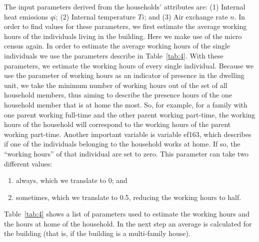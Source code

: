 \documentclass[11pt]{IJM-article}
\begin{document}
The input parameters derived from the households' attributes are: (1) Internal
heat emissions $qi$; (2) Internal temperature $Ti$; and (3) Air exchange rate
$n$. In order to find values for these parameters, we first estimate the
average working hours of the individuals living in the building.  Here we make
use of the micro census again. In order to estimate the average working hours
of the single individuals we use the parameters describe in Table~\ref{tab:4}.
With these parameters, we estimate the working hours of every single
individual. Because we use the parameter of working hours as an indicator of
presence in the dwelling unit, we take the minimum number of working hours out
of the set of all household members, thus aiming to describe the presence hours
of the one household member that is at home the most. So, for example, for a
family with one parent working full-time and the other parent working
part-time, the working hours of the household will correspond to the working
hours of the parent working part-time. Another important variable is variable
ef163, which describes if one of the individuals belonging to the household
works at home. If so, the ``working hours'' of that individual are set to zero.
This parameter can take two different values:

\begin{enumerate}
    \item always, which we translate to 0; and
    \item sometimes, which we translate to 0.5, reducing the working hours to
        half.
\end{enumerate}

Table~\ref{tab:4} shows a list of parameters used to estimate the working hours
and the hours at home of the household. In the next step an average is
calculated for the building (that is, if the building is a multi-family
house).
\end{document}
